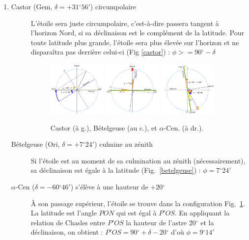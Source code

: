 \documentclass[a4paper,10pt]{report}
\renewcommand{\deg}{\ensuremath{^{\circ}}}
\begin{document}
\begin{Answer}
\begin{enumerate}
  \item
    \begin{description}
    \item[Castor (Gem, $\delta = +31\deg56'$) circumpolaire]
      L'étoile sera juste circumpolaire, c'est-à-dire passera tangent
      à l'horizon Nord, si sa déclinaison est le complément de la
      latitude.  Pour toute latitude plus grande, l'étoile sera plus
      élevée sur l'horizon et ne disparaîtra pas derrière celui-ci
      (Fig \ref{castor}) : $\phi>=90\deg-\delta$
      \begin{figure}[htp]
        \centering
        \includegraphics[width=0.3\textwidth]{castor}
        \includegraphics[width=0.3\textwidth]{betelgeuse}
        \includegraphics[width=0.3\textwidth]{cen}
        \label{castor}
        \label{betelgeuse}
        \label{cen}
        \caption{Castor (à g.), Bételgeuse (au c.), et
          $\alpha$-Cen. (à dr.).}
      \end{figure}

    \item[Bételgeuse (Ori, $\delta = +7\deg24'$) culmine au zénith]
      Si l'étoile est au moment de sa culmination au zénith
      (nécessairement), sa déclinaison est égale à la latitude
      (Fig.~\ref{betelgeuse}) : $\phi=7\deg24'$

    \item[$\alpha$-Cen ($\delta = - 60\deg46'$) s'élève à une
      hauteur de $+20\deg$] À son passage supérieur, l'étoile se
      trouve dans la configuration Fig.~\ref{cen}.  La latitude est
      l'angle $PON$ qui est égal à $P'OS$. En appliquant la relation
      de Chasles entre $P'OS$ la hauteur de l'astre $20\deg$ et la
      déclinaison, on obtient : $P'OS=90\deg+\delta-20\deg$ d'où
      $\phi = 9\deg14'$
    \end{description}
  \end{enumerate}
\end{Answer}
\end{document}
